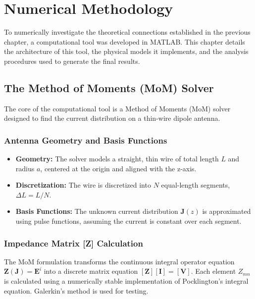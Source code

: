 \documentclass[11pt, a4paper]{report}
\begin{document}
\chapter{Numerical Methodology}

To numerically investigate the theoretical connections established in the previous chapter, a computational tool was developed in MATLAB. This chapter details the architecture of this tool, the physical models it implements, and the analysis procedures used to generate the final results.

\section{The Method of Moments (MoM) Solver}
The core of the computational tool is a Method of Moments (MoM) solver designed to find the current distribution on a thin-wire dipole antenna.

\subsection{Antenna Geometry and Basis Functions}
\begin{itemize}
    \item \textbf{Geometry:} The solver models a straight, thin wire of total length $L$ and radius $a$, centered at the origin and aligned with the z-axis.
    \item \textbf{Discretization:} The wire is discretized into $N$ equal-length segments, $\Delta L = L/N$.
    \item \textbf{Basis Functions:} The unknown current distribution $\mathbf{J}(z)$ is approximated using pulse functions, assuming the current is constant over each segment.
\end{itemize}

\subsection{Impedance Matrix [Z] Calculation}
The MoM formulation transforms the continuous integral operator equation $\mathbf{Z}(\mathbf{J}) = \mathbf{E}^i$ into a discrete matrix equation $[\mathbf{Z}][\mathbf{I}] = [\mathbf{V}]$. Each element $Z_{mn}$ is calculated using a numerically stable implementation of Pocklington's integral equation. Galerkin's method is used for testing.
\end{document}
